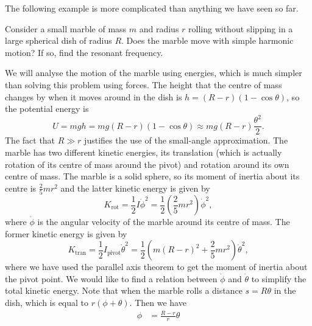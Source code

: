 \documentclass[../classical_mechanics.tex]{subfiles}
\begin{document}
        The following example is more complicated than anything we have seen so far.
        \begin{example}
            Consider a small marble of mass $m$ and radius $r$ rolling without slipping in a large spherical dish of radius $R$.
            Does the marble move with simple harmonic motion?
            If so, find the resonant frequency.

            We will analyse the motion of the marble using energies, which is much simpler than solving this problem using forces.
            The height that the centre of mass changes by when it moves around in the dish is $h=(R-r)(1-\cos\theta)$, so the potential energy is
            \begin{equation}
                U=mgh=mg(R-r)(1-\cos\theta)\approx mg(R-r)\frac{\theta^2}{2}.
            \end{equation}
            The fact that $R\gg r$ justifies the use of the small-angle approximation.
            The marble has two different kinetic energies, its translation (which is actually rotation of its centre of mass around the pivot) and rotation around its own centre of mass.
            The marble is a solid sphere, so its moment of inertia about its centre is $\frac{2}{5}mr^2$ and the latter kinetic energy is given by
            \begin{equation}
                K_\text{rot}=\frac{1}{2}I\dot{\phi}^2=\frac{1}{2}\left(\frac{2}{5}mr^2\right)\dot{\phi}^2,
            \end{equation}
            where $\dot{\phi}$ is the angular velocity of the marble around its centre of mass.
            The former kinetic energy is given by
            \begin{equation}
                K_\text{tran}=\frac{1}{2}I_\text{pivot}\dot{\theta}^2=\frac{1}{2}\left(m(R-r)^2+\frac{2}{5}mr^2\right)\dot{\theta}^2,
            \end{equation}
            where we have used the parallel axis theorem to get the moment of inertia about the pivot point.
            We would like to find a relation between $\dot{\phi}$ and $\dot{\theta}$ to simplify the total kinetic energy.
            Note that when the marble rolls a distance $s=R\theta$ in the dish, which is equal to $r(\phi+\theta)$.
            Then we have
            \begin{align}
                \phi&=\frac{R-r}{r}\theta\\

\end{align}
\end{example}
\end{document}
